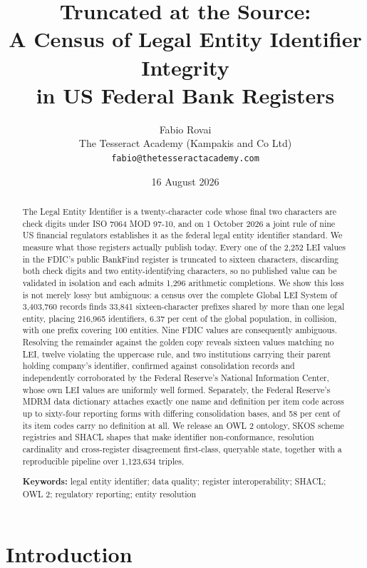 \documentclass[11pt]{article}
\title{\textbf{Truncated at the Source:\\A Census of Legal Entity Identifier Integrity\\in US Federal Bank Registers}}
\author{Fabio Rovai\\\small The Tesseract Academy (Kampakis and Co Ltd)\\\small \texttt{fabio@thetesseractacademy.com}}
\date{16 August 2026}
\begin{document}
\maketitle

\begin{abstract}
\noindent
The Legal Entity Identifier is a twenty-character code whose final two characters are check digits under ISO 7064 MOD 97-10, and on 1 October 2026 a joint rule of nine US financial regulators establishes it as the federal legal entity identifier standard. We measure what those registers actually publish today. Every one of the 2,252 LEI values in the FDIC's public BankFind register is truncated to sixteen characters, discarding both check digits and two entity-identifying characters, so no published value can be validated in isolation and each admits 1,296 arithmetic completions. We show this loss is not merely lossy but ambiguous: a census over the complete Global LEI System of 3,403,760 records finds 33,841 sixteen-character prefixes shared by more than one legal entity, placing 216,965 identifiers, 6.37 per cent of the global population, in collision, with one prefix covering 100 entities. Nine FDIC values are consequently ambiguous. Resolving the remainder against the golden copy reveals sixteen values matching no LEI, twelve violating the uppercase rule, and two institutions carrying their parent holding company's identifier, confirmed against consolidation records and independently corroborated by the Federal Reserve's National Information Center, whose own LEI values are uniformly well formed. Separately, the Federal Reserve's MDRM data dictionary attaches exactly one name and definition per item code across up to sixty-four reporting forms with differing consolidation bases, and 58 per cent of its item codes carry no definition at all. We release an OWL 2 ontology, SKOS scheme registries and SHACL shapes that make identifier non-conformance, resolution cardinality and cross-register disagreement first-class, queryable state, together with a reproducible pipeline over 1,123,634 triples.

\medskip
\noindent\textbf{Keywords:} legal entity identifier; data quality; register interoperability; SHACL; OWL 2; regulatory reporting; entity resolution
\end{abstract}

\section{Introduction}
\end{document}
